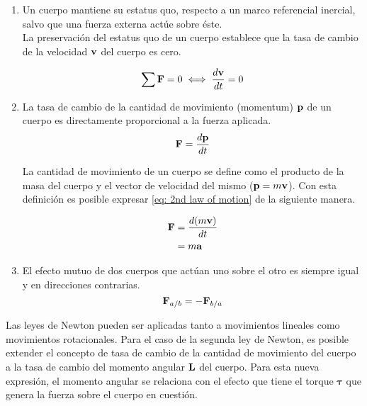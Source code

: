 \begin{enumerate}
 \item Un cuerpo mantiene su estatus quo, 
 respecto a un marco referencial inercial, salvo
 que una fuerza externa actúe sobre éste.\\
 
 La preservación del estatus quo de un cuerpo establece
 que la tasa de cambio de la velocidad $\bold{v}$ 
 del cuerpo es cero.
 
 \begin{equation}
  \sum \bold{F} = 0 \iff \dfrac{d \bold{v}}{dt} = 0
  \label{eq: 1st law of motion}
 \end{equation}

 \item La tasa de cambio de la cantidad de movimiento 
 (momentum) $\bold{p}$ de un cuerpo
 es directamente proporcional a la fuerza aplicada.
 \begin{equation}
  \bold{F} = \dfrac{d \bold{p}}{dt}
  \label{eq: 2nd law of motion}
 \end{equation}
 
 La cantidad de movimiento de un cuerpo se define como el 
 producto de la masa del cuerpo y el vector de velocidad 
 del mismo ($\bold{p} = m \bold{v}$). 
 Con esta definición es posible expresar 
 \eqref{eq: 2nd law of motion} de la siguiente manera.
 
 \begin{equation}
  \begin{split}
   \bold{F} &= \dfrac{d (m\bold{v})}{dt}\\
   &= m \bold{a}
  \end{split}
  \label{eq: conservation of linear momentum}
 \end{equation}


 \item El efecto mutuo de dos cuerpos que actúan 
 uno sobre el otro es siempre igual y en direcciones contrarias.
 \begin{equation}
  \bold{F}_{a/b} = -\bold{F}_{b/a}
  \label{eq: 3rd law of motion}
 \end{equation}

\end{enumerate}


Las leyes de Newton pueden ser aplicadas tanto a 
movimientos lineales como movimientos rotacionales.
Para el caso de la segunda ley de Newton, 
es posible extender el concepto de tasa de cambio
de la cantidad de movimiento del cuerpo 
a la tasa de cambio del momento angular $\bold{L}$
del cuerpo.
Para esta nueva expresión, el momento angular se relaciona
con el efecto que tiene el torque $\boldsymbol{\tau}$
que genera la fuerza sobre el cuerpo en cuestión.

